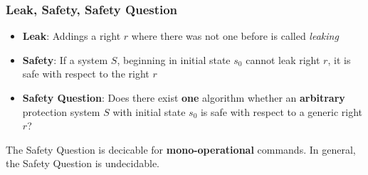 \documentclass[12pt,A4]{extarticle}
\begin{document}
\subsubsection{Leak, Safety, Safety Question}
\begin{itemize}
  \item{\textbf{Leak}: Addings a right $r$ where there was not one before is called \textit{leaking}}
  \item{\textbf{Safety}: If a system $S$, beginning in initial state $s_0$ cannot leak right $r$, it is safe with respect to the right $r$}
  \item{\textbf{Safety Question}: Does there exist \textbf{one} algorithm whether an \textbf{arbitrary} protection system $S$ with initial state $s_0$ is safe with respect to a generic right $r$?}
\end{itemize}
The Safety Question is decicable for \textbf{mono-operational} commands. In general, the Safety Question is undecidable.

\newpage


\end{document}
